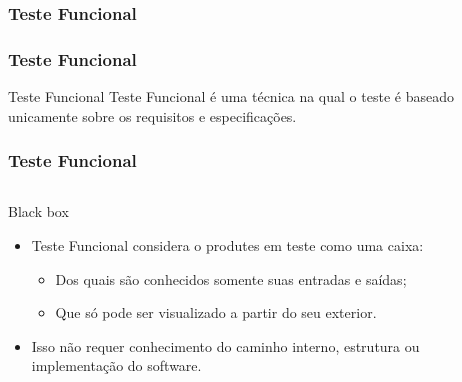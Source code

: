 \begin{frame}[c,parent={cmap:software-testing}, hasprev=false, hasnext=false]
\frametitle{Teste Funcional}
\label{cmap:functional-testing}

\end{frame}



\begin{frame}[parent={cmap:functional-testing}, hasprev=false, hasnext=true]
\frametitle{Teste Funcional}
\label{concept:functional-testing}

\begin{block:concept}{Teste Funcional}
Teste Funcional é uma técnica na qual o teste é baseado unicamente sobre os
requisitos e especificações.
\end{block:concept}



\begin{frame}[hasprev=true, hasnext=true]
\frametitle{Teste Funcional}
\label{concept:black-box}

\begin{columns}[t]
\begin{block:fact}{Black box}
\begin{itemize}
	\item Teste Funcional considera o produtes em teste como uma caixa:
	\begin{itemize}
		\item Dos quais são conhecidos somente suas entradas e saídas;

		\item Que só pode ser visualizado a partir do seu exterior.
	\end{itemize}

	\item Isso não requer conhecimento do caminho interno, estrutura ou 
	implementação do software.
\end{itemize}
\end{block:fact}





\end{columns}
\end{frame}
\end{frame}
